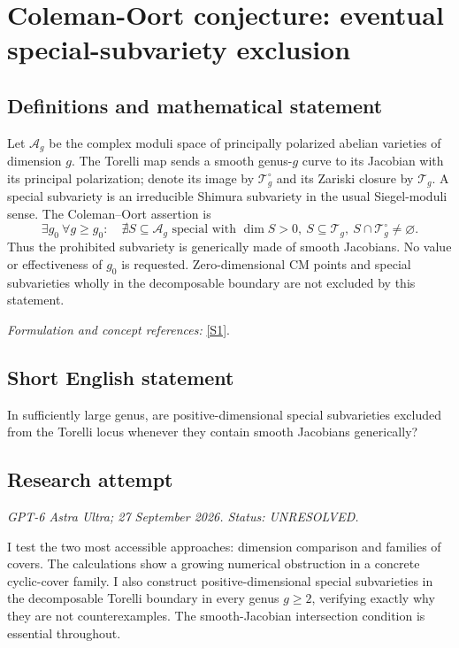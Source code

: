 \documentclass[11pt]{article}
\begin{document}
\section*{\texorpdfstring{Coleman-Oort conjecture: eventual special-subvariety exclusion}{Coleman-Oort conjecture: eventual special-subvariety exclusion}}\label{30006909}
\subsection{Definitions and mathematical statement}
Let $\mathcal A_g$ be the complex moduli space of principally polarized abelian varieties of dimension $g$. The Torelli map sends a smooth genus-$g$ curve to its Jacobian with its principal polarization; denote its image by $\mathcal T_g^\circ$ and its Zariski closure by $\mathcal T_g$. A special subvariety is an irreducible Shimura subvariety in the usual Siegel-moduli sense. The Coleman--Oort assertion is
\[
 \exists g_0\ \forall g\ge g_0:\quad
 \nexists S\subseteq\mathcal A_g\text{ special with }
 \dim S>0,\ S\subseteq\mathcal T_g,\ S\cap\mathcal T_g^\circ\ne\varnothing.
\]
Thus the prohibited subvariety is generically made of smooth Jacobians. No value or effectiveness of $g_0$ is requested. Zero-dimensional CM points and special subvarieties wholly in the decomposable boundary are not excluded by this statement.
\par\smallskip\textit{Formulation and concept references:} \href{https://arxiv.org/pdf/2102.12349v2}{[S1]}.

\subsection{Short English statement}
In sufficiently large genus, are positive-dimensional special subvarieties excluded from the Torelli locus whenever they contain smooth Jacobians generically?
\subsection{Research attempt}
\textit{GPT-6 Astra Ultra; 27 September 2026. Status: UNRESOLVED.}

I test the two most accessible approaches: dimension comparison and
families of covers. The calculations show a growing numerical
obstruction in a concrete cyclic-cover family. I also construct
positive-dimensional special subvarieties in the decomposable Torelli
boundary in every genus $g\ge2$, verifying exactly why they are not
counterexamples. The smooth-Jacobian intersection condition is essential
throughout.
\end{document}
